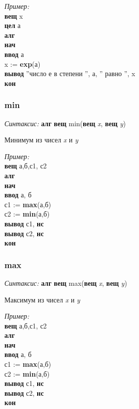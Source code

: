 \emph{Пример:}  
\sffamily
~\\\textbf{вещ} x
~\\\textbf{цел} а
~\\\textbf{алг
~\\нач
~\\\otstup ввод} а
~\\\otstup x := \textbf{exp}(а)
~\\\otstup \textbf{вывод} ''число е в степени '', а, '' равно '', x
~\\\textbf{кон}

\normalfont
\subsubsection{min}

\emph{Синтаксис:} \textbf{алг} \textbf{вещ} min(\textbf{вещ} \emph{x}, \textbf{вещ} \emph{y})


     
 
       Минимум  из чисел \emph{x} и \emph{y}
      
\emph{Пример:}  
\sffamily
~\\\textbf{вещ} а,б,с1, с2
~\\\textbf{алг
~\\нач
~\\\otstup ввод} а, б
~\\\otstup с1 :=  \textbf{max}(а,б)
~\\\otstup с2 :=  \textbf{min}(а,б)
~\\\otstup \textbf{вывод} с1, \textbf{нс}
~\\\otstup \textbf{вывод} с2, \textbf{нс}
~\\\textbf{кон}

\normalfont
\subsubsection{max}

\emph{Синтаксис:} \textbf{алг} \textbf{вещ} max(\textbf{вещ} \emph{x}, \textbf{вещ} \emph{y})


   
  
       Максимум из чисел \emph{x} и \emph{y}
      
\emph{Пример:}  
\sffamily
~\\\textbf{вещ} а,б,с1, с2
~\\\textbf{алг
~\\нач
~\\\otstup ввод} а, б
~\\\otstup с1 :=  \textbf{max}(а,б)
~\\\otstup с2 :=  \textbf{min}(а,б)
~\\\otstup \textbf{вывод} с1, \textbf{нс}
~\\\otstup \textbf{вывод} с2, \textbf{нс}
~\\\textbf{кон}

